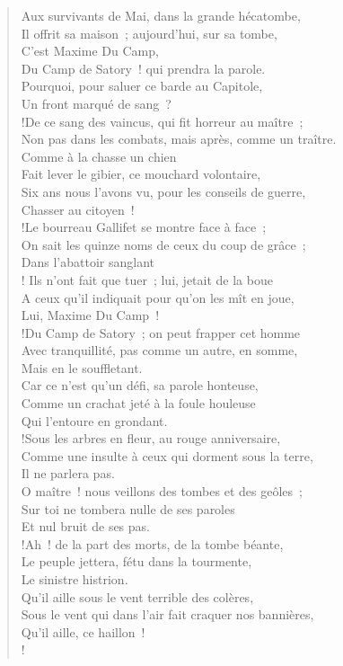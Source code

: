 \documentclass[french,twoside]{book} %
\begin{document}
\begin{verse}
Aux survivants de Mai, dans la grande hécatombe,\\
Il offrit sa maison ; aujourd’hui, sur sa tombe,\\
C’est Maxime Du Camp,\\
Du Camp de Satory ! qui prendra la parole.\\
Pourquoi, pour saluer ce barde au Capitole,\\
Un front marqué de sang ?\\!De ce sang des vaincus, qui fit horreur au maître ;\\
Non pas dans les combats, mais après, comme un traître.\\
Comme à la chasse un chien\\
Fait lever le gibier, ce mouchard volontaire,\\
Six ans nous l’avons vu, pour les conseils de guerre,\\
Chasser au citoyen !\\!Le bourreau Gallifet se montre face à face ;\\
On sait les quinze noms de ceux du coup de grâce ; \\
Dans l’abattoir sanglant\\! Ils n’ont fait que tuer ; lui, jetait de la boue\\
A ceux qu’il indiquait pour qu’on les mît en joue,\\
Lui, Maxime Du Camp !\\!Du Camp de Satory ; on peut frapper cet homme\\
Avec tranquillité, pas comme un autre, en somme,\\
Mais en le souffletant.\\
Car ce n’est qu’un défi, sa parole honteuse,\\
Comme un crachat jeté à la foule houleuse\\
Qui l’entoure en grondant.\\!Sous les arbres en fleur, au rouge anniversaire,\\
Comme une insulte à ceux qui dorment sous la terre,\\
Il ne parlera pas.\\
O maître ! nous veillons des tombes et des geôles ;\\
Sur toi ne tombera nulle de ses paroles\\
Et nul bruit de ses pas.\\!Ah ! de la part des morts, de la tombe béante,\\
Le peuple jettera, fétu dans la tourmente,\\
Le sinistre histrion.\\
Qu’il aille sous le vent terrible des colères,\\
Sous le vent qui dans l’air fait craquer nos bannières,\\
Qu’il aille, ce haillon !\\!
\end{verse}
\end{document}
